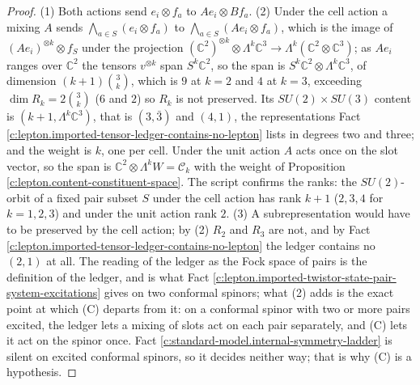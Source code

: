 \documentclass[11pt]{article}
\theoremstyle{definition}
\theoremstyle{plain}
\providecommand{\C}{}\renewcommand{\C}{\mathbb{C}}
\providecommand{\Con}{}\renewcommand{\Con}{\mathcal{C}}
\begin{document}
\begin{proof}
(1) Both actions send $e_{i} \otimes f_{a}$ to $Ae_{i} \otimes Bf_{a}$. (2) Under the cell action a mixing $A$ sends $\bigwedge_{a \in S}(e_{i} \otimes f_{a})$ to $\bigwedge_{a \in S}(Ae_{i} \otimes f_{a})$, which is the image of $(Ae_{i})^{\otimes k} \otimes f_{S}$ under the projection $(\C^{2})^{\otimes k} \otimes \Lambda^{k}\C^{3} \to \Lambda^{k}(\C^{2} \otimes \C^{3})$; as $Ae_{i}$ ranges over $\C^{2}$ the tensors $v^{\otimes k}$ span $S^{k}\C^{2}$, so the span is $S^{k}\C^{2} \otimes \Lambda^{k}\C^{3}$, of dimension $(k+1)\binom{3}{k}$, which is $9$ at $k = 2$ and $4$ at $k = 3$, exceeding $\dim R_{k} = 2\binom{3}{k}$ ($6$ and $2$) so $R_{k}$ is not preserved. Its $SU(2) \times SU(3)$ content is $(k+1, \Lambda^{k}\C^{3})$, that is $(3,\bar{3})$ and $(4,1)$, the representations Fact \ref{c:lepton.imported-tensor-ledger-contains-no-lepton} lists in degrees two and three; and the weight is $k$, one per cell. Under the unit action $A$ acts once on the slot vector, so the span is $\C^{2} \otimes \Lambda^{k}W = \Con_{k}$ with the weight of Proposition \ref{c:lepton.content-constituent-space}. The script confirms the ranks: the $SU(2)$-orbit of a fixed pair subset $S$ under the cell action has rank $k + 1$ ($2, 3, 4$ for $k = 1, 2, 3$) and under the unit action rank $2$. (3) A subrepresentation would have to be preserved by the cell action; by (2) $R_{2}$ and $R_{3}$ are not, and by Fact \ref{c:lepton.imported-tensor-ledger-contains-no-lepton} the ledger contains no $(2,1)$ at all. The reading of the ledger as the Fock space of pairs is the definition of the ledger, and is what Fact \ref{c:lepton.imported-twistor-state-pair-system-excitations} gives on two conformal spinors; what (2) adds is the exact point at which (C) departs from it: on a conformal spinor with two or more pairs excited, the ledger lets a mixing of slots act on each pair separately, and (C) lets it act on the spinor once. Fact \ref{c:standard-model.internal-symmetry-ladder} is silent on excited conformal spinors, so it decides neither way; that is why (C) is a hypothesis.

\end{proof}
\end{document}
